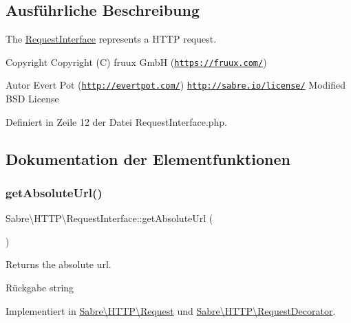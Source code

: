 \subsection{Ausführliche Beschreibung}
The \mbox{\hyperlink{interface_sabre_1_1_h_t_t_p_1_1_request_interface}{Request\+Interface}} represents a H\+T\+TP request.

\begin{DoxyCopyright}{Copyright}
Copyright (C) fruux GmbH (\href{https://fruux.com/}{\tt https\+://fruux.\+com/}) 
\end{DoxyCopyright}
\begin{DoxyAuthor}{Autor}
Evert Pot (\href{http://evertpot.com/}{\tt http\+://evertpot.\+com/})  \href{http://sabre.io/license/}{\tt http\+://sabre.\+io/license/} Modified B\+SD License 
\end{DoxyAuthor}


Definiert in Zeile 12 der Datei Request\+Interface.\+php.



\subsection{Dokumentation der Elementfunktionen}
\mbox{\label{interface_sabre_1_1_h_t_t_p_1_1_request_interface_a8c8267e6a7d901a0f63f66a2ecc59a91}} 
\subsubsection{\texorpdfstring{get\+Absolute\+Url()}{getAbsoluteUrl()}}
{\footnotesize\ttfamily Sabre\textbackslash{}\+H\+T\+T\+P\textbackslash{}\+Request\+Interface\+::get\+Absolute\+Url (\begin{DoxyParamCaption}{ }\end{DoxyParamCaption})}

Returns the absolute url.

\begin{DoxyReturn}{Rückgabe}
string 
\end{DoxyReturn}


Implementiert in \mbox{\hyperlink{class_sabre_1_1_h_t_t_p_1_1_request_a112af52e6293b735ac82a8c92f83d637}{Sabre\textbackslash{}\+H\+T\+T\+P\textbackslash{}\+Request}} und \mbox{\hyperlink{class_sabre_1_1_h_t_t_p_1_1_request_decorator_a5534f8c39e2618f40c5c1ff41c44a5ab}{Sabre\textbackslash{}\+H\+T\+T\+P\textbackslash{}\+Request\+Decorator}}.

